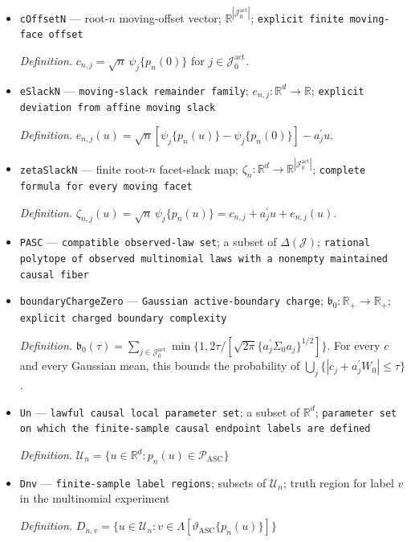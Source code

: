 \documentclass{article}
\begin{document}
\begin{itemize}
  \item \texttt{cOffsetN} --- root-\(n\) moving-offset vector; \(\mathbb R^{|\mathcal J_0^{\mathrm{act}}|}\); \texttt{explicit finite moving-\allowbreak{}face offset}
  \par\smallskip\noindent\emph{Definition.} \(c_{n,j}=\sqrt n\,\psi_j\{p_n(0)\}\) for \(j\in\mathcal J_0^{\mathrm{act}}\).
  \item \texttt{eSlackN} --- \texttt{moving-\allowbreak{}slack remainder family}; \(e_{n,j}:\mathbb R^d\to\mathbb R\); \texttt{explicit deviation from affine moving slack}
  \par\smallskip\noindent\emph{Definition.} \(e_{n,j}(u)=\sqrt n[\psi_j\{p_n(u)\}-\psi_j\{p_n(0)\}]-a_j^{\prime}u\).
  \item \texttt{zetaSlackN} --- finite root-\(n\) facet-slack map; \(\zeta_n:\mathbb R^d\to\mathbb R^{|\mathcal J_0^{\mathrm{act}}|}\); \texttt{complete formula for every moving facet}
  \par\smallskip\noindent\emph{Definition.} \(\zeta_{n,j}(u)=\sqrt n\,\psi_j\{p_n(u)\}=c_{n,j}+a_j^{\prime}u+e_{n,j}(u)\).
  \item \texttt{PASC} --- \texttt{compatible observed-\allowbreak{}law set}; a subset of \(\Delta(\mathcal J)\); \texttt{rational polytope of observed multinomial laws with a nonempty maintained causal fiber}
  \item \texttt{boundaryChargeZero} --- \texttt{Gaussian active-\allowbreak{}boundary charge}; \(\mathfrak b_0:\mathbb R_+\to\mathbb R_+\); \texttt{explicit charged boundary complexity}
  \par\smallskip\noindent\emph{Definition.} \(\mathfrak b_0(\tau)=\sum_{j\in\mathcal J_0^{\mathrm{act}}}\min\{1,2\tau/[\sqrt{2\pi}\{a_j^{\prime}\Sigma_0a_j\}^{1/2}]\}\). For every \(c\) and every Gaussian mean, this bounds the probability of \(\bigcup_j\{|c_j+a_j^{\prime}W_0|\le\tau\}\).
  \item \texttt{Un} --- \texttt{lawful causal local parameter set}; a subset of \(\mathbb R^d\); \texttt{parameter set on which the finite-\allowbreak{}sample causal endpoint labels are defined}
  \par\smallskip\noindent\emph{Definition.} \(\mathcal U_n=\{u\in\mathbb R^d:p_n(u)\in\mathcal P_{\mathrm{ASC}}\}\)
  \item \texttt{Dnv} --- \texttt{finite-\allowbreak{}sample label regions}; subsets of \(\mathcal U_n\); truth region for label \(v\) in the multinomial experiment
  \par\smallskip\noindent\emph{Definition.} \(D_{n,v}=\{u\in\mathcal U_n:v\in\Lambda[\vartheta_{\mathrm{ASC}}\{p_n(u)\}]\}\)

\end{itemize}
\end{document}
